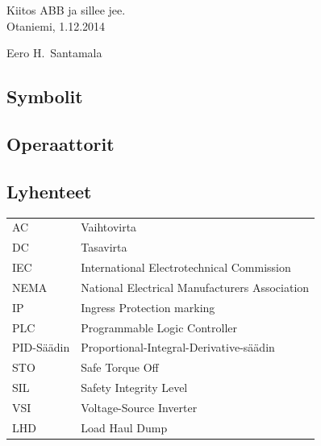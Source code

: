 \documentclass[finnish,12pt,a4paper,pdftex,elec,utf8]{aaltothesis}
\begin{document}

Kiitos ABB ja sillee jee.\\

\vspace{5cm}
Otaniemi, 1.12.2014

\vspace{5mm}
{\hfill Eero H.\ Santamala \hspace{1cm}}

\newpage


\thesistableofcontents



\subsection*{Symbolit}


\subsection*{Operaattorit}



\subsection*{Lyhenteet}

\begin{tabular}{ll}
AC         & Vaihtovirta \\
DC         & Tasavirta \\
IEC	       & International Electrotechnical Commission \\
NEMA       & National Electrical Manufacturers Association \\
IP		   & Ingress Protection marking \\
PLC		   & Programmable Logic Controller \\
PID-Säädin & Proportional-Integral-Derivative-säädin \\
STO		   & Safe Torque Off \\
SIL		   & Safety Integrity Level \\
VSI		   & Voltage-Source Inverter \\
LHD		   & Load Haul Dump
\end{tabular}


\cleardoublepage
\storeinipagenumber
{}
\setcounter{page}{1}
\end{document}
